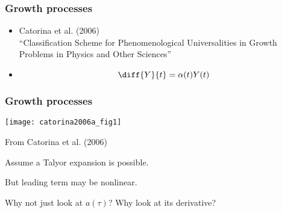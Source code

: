    
\begin{frame}
  \frametitle{Growth processes}

  \begin{itemize}
  \item<1-> 
    Catorina et al. (2006)\cite{catorina2006a}\\
    ``Classification Scheme for Phenomenological Universalities
    in Growth Problems in Physics and Other Sciences''
  \item<2->
    $$
    \diff{Y}{t}
    =
    \alpha(t)
    Y(t)
    $$
  \end{itemize}

\end{frame}

\begin{frame}
  \frametitle{Growth processes}

  \texttt{[image: catorina2006a\_fig1]}

  \tiny{From Catorina et al. (2006)\cite{catorina2006a}}

  Assume a Talyor expansion is possible.

  But leading term may be nonlinear.

  Why not just look at $a(\tau)$?
  Why look at its derivative?
\end{frame}
